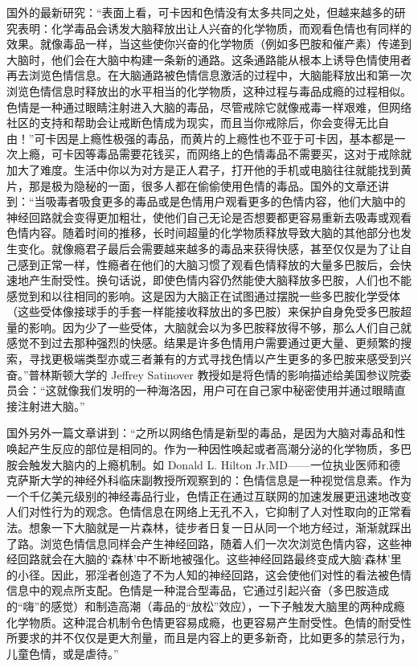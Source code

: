 国外的最新研究：“表面上看，可卡因和色情没有太多共同之处，但越来越多的研究表明：化学毒品会诱发大脑释放出让人兴奋的化学物质，而观看色情也有同样的效果。就像毒品一样，当这些使你兴奋的化学物质（例如多巴胺和催产素）传递到大脑时，他们会在大脑中构建一条新的通路。这条通路能从根本上诱导色情使用者再去浏览色情信息。在大脑通路被色情信息激活的过程中，大脑能释放出和第一次浏览色情信息时释放出的水平相当的化学物质，这种过程与毒品成瘾的过程相似。色情是一种通过眼睛注射进入大脑的毒品，尽管戒除它就像戒毒一样艰难，但网络社区的支持和帮助会让戒断色情成为现实，而且当你戒除后，你会变得无比自由！”可卡因是上瘾性极强的毒品，而黄片的上瘾性也不亚于可卡因，基本都是一次上瘾，可卡因等毒品需要花钱买，而网络上的色情毒品不需要买，这对于戒除就加大了难度。生活中你以为对方是正人君子，打开他的手机或电脑往往就能找到黄片，那是极为隐秘的一面，很多人都在偷偷使用色情的毒品。国外的文章还讲到：“当吸毒者吸食更多的毒品或是色情用户观看更多的色情内容，他们大脑中的神经回路就会变得更加粗壮，使他们自己无论是否想要都更容易重新去吸毒或观看色情内容。随着时间的推移，长时间超量的化学物质释放导致大脑的其他部分也发生变化。就像瘾君子最后会需要越来越多的毒品来获得快感，甚至仅仅是为了让自己感到正常一样，性瘾者在他们的大脑习惯了观看色情释放的大量多巴胺后，会快速地产生耐受性。换句话说，即使色情内容仍然能使大脑释放多巴胺，人们也不能感觉到和以往相同的影响。这是因为大脑正在试图通过摆脱一些多巴胺化学受体（这些受体像接球手的手套一样能接收释放出的多巴胺）来保护自身免受多巴胺超量的影响。因为少了一些受体，大脑就会以为多巴胺释放得不够，那么人们自己就感觉不到过去那种强烈的快感。结果是许多色情用户需要通过更大量、更频繁的搜索，寻找更极端类型亦或三者兼有的方式寻找色情以产生更多的多巴胺来感受到兴奋。”普林斯顿大学的 Jeffrey Satinover 教授如是将色情的影响描述给美国参议院委员会：“这就像我们发明的一种海洛因，用户可在自己家中秘密使用并通过眼睛直接注射进大脑。”

国外另外一篇文章讲到：“之所以网络色情是新型的毒品，是因为大脑对毒品和性唤起产生反应的部位是相同的。作为一种因性唤起或者高潮分泌的化学物质，多巴胺会触发大脑内的上瘾机制。如 Donald L. Hilton Jr.MD——一位执业医师和德克萨斯大学的神经外科临床副教授所观察到的：色情信息是一种视觉信息素。作为一个千亿美元级别的神经毒品行业，色情正在通过互联网的加速发展更迅速地改变人们对性行为的观念。色情信息在网络上无孔不入，它抑制了人对性取向的正常看法。想象一下大脑就是一片森林，徒步者日复一日从同一个地方经过，渐渐就踩出了路。浏览色情信息同样会产生神经回路，随着人们一次次浏览色情内容，这些神经回路就会在大脑的‘森林’中不断地被强化。这些神经回路最终变成大脑‘森林’里的小径。因此，邪淫者创造了不为人知的神经回路，这会使他们对性的看法被色情信息中的观点所支配。色情是一种混合型毒品，它通过引起兴奋（多巴胺造成的“嗨”的感觉）和制造高潮（毒品的“放松”效应），一下子触发大脑里的两种成瘾化学物质。这种混合机制令色情更容易成瘾，也更容易产生耐受性。色情的耐受性所要求的并不仅仅是更大剂量，而且是内容上的更多新奇，比如更多的禁忌行为，儿童色情，或是虐待。”

